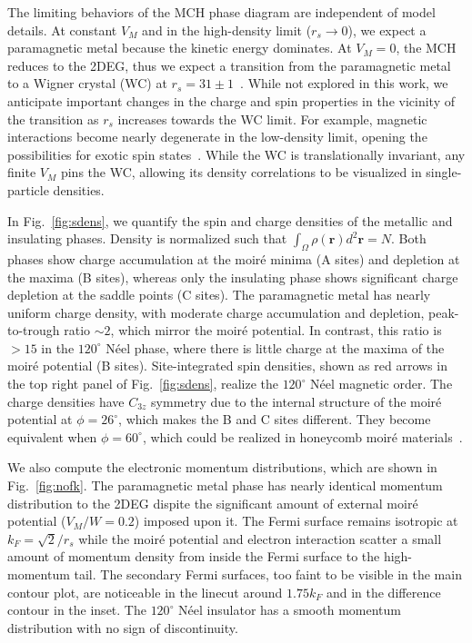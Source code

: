 \documentclass[aps,prb,showpacs,preprintnumbers,amsmath,amssymb,superscriptaddress,twocolumn]{revtex4-1}
\newcommand{\bs}{\boldsymbol}
\begin{document}
The limiting behaviors of the MCH phase diagram are independent of model details.
At constant $V_M$ and in the high-density limit ($r_s\rightarrow0$), we expect a paramagnetic metal because the kinetic energy dominates.
At $V_M=0$, the MCH reduces to the 2DEG, thus we expect a transition from the paramagnetic metal to a Wigner crystal (WC) at $r_s=31\pm1$~\cite{Drummond2009}.
While not explored in this work, we anticipate important changes in the charge and spin properties in the vicinity of the transition as $r_s$ increases towards the WC limit.
For example, magnetic interactions become nearly degenerate in the low-density limit, opening the possibilities for exotic spin states~\cite{Bernu2001}.
While the WC is translationally invariant, any finite $V_M$ pins the WC, allowing its density correlations to be visualized in single-particle densities.



In Fig.~\ref{fig:sdens}, we quantify the spin and charge densities of the metallic and insulating phases.
Density is normalized such that $\int_\Omega \rho(\bs{r})d^2\bs{r}=N$.
Both phases show charge accumulation at the moir\'e minima (A sites) and depletion at the maxima (B sites), whereas only the insulating phase shows significant charge depletion at the saddle points (C sites).
The paramagnetic metal has nearly uniform charge density, with moderate charge accumulation and depletion, peak-to-trough ratio $\sim 2$, which mirror the moir\'e potential.
In contrast, this ratio is $> 15$ in the $120^\circ$ N\'eel phase, where there is little charge at the maxima of the moir\'e potential (B sites).
Site-integrated spin densities, shown as red arrows in the top right panel of Fig.~\ref{fig:sdens}, realize the $120^\circ$ N\'eel magnetic order.
The charge densities have $C_{3z}$ symmetry due to the internal structure of the moir\'e potential at $\phi=26^\circ$, which makes the B and C sites different.
They become equivalent when $\phi=60^\circ$, which could be realized in honeycomb moir\'e materials~\cite{Angeli2021}.

We also compute the
electronic momentum distributions, which are shown in Fig.~\ref{fig:nofk}.
The paramagnetic metal phase has nearly identical momentum distribution
to
the 2DEG dispite the significant amount of external moir\'e potential ($V_M/W=0.2$) imposed upon it.
The Fermi surface remains isotropic at $k_F=\sqrt{2}/r_s$ while the moir\'e potential and electron interaction scatter a small amount of momentum density from inside the Fermi surface to the high-momentum tail.
The secondary Fermi surfaces,
too faint to be visible in the main contour plot,
are noticeable in the linecut around $1.75k_F$ and in the difference contour in the inset.
The $120^\circ$ N\'eel insulator has a smooth momentum distribution with no sign of discontinuity.
\end{document}
